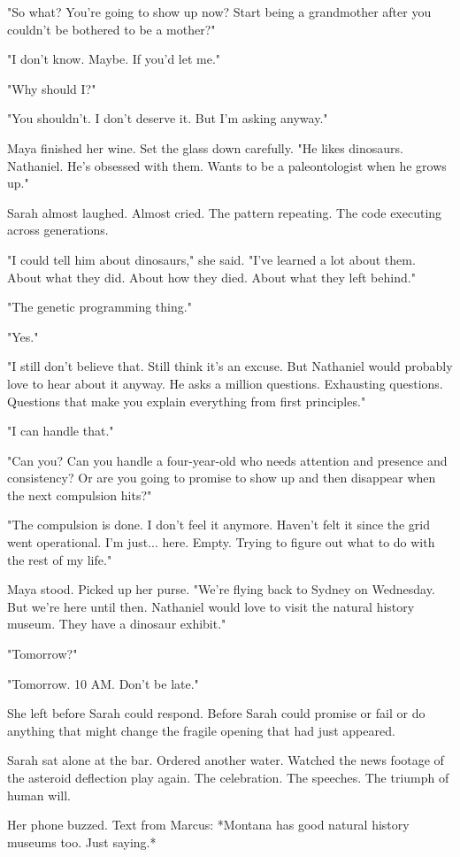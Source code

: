 "So what? You're going to show up now? Start being a grandmother after you couldn't be bothered to be a mother?"

"I don't know. Maybe. If you'd let me."

"Why should I?"

"You shouldn't. I don't deserve it. But I'm asking anyway."

Maya finished her wine. Set the glass down carefully. "He likes dinosaurs. Nathaniel. He's obsessed with them. Wants to be a paleontologist when he grows up."

Sarah almost laughed. Almost cried. The pattern repeating. The code executing across generations.

"I could tell him about dinosaurs," she said. "I've learned a lot about them. About what they did. About how they died. About what they left behind."

"The genetic programming thing."

"Yes."

"I still don't believe that. Still think it's an excuse. But Nathaniel would probably love to hear about it anyway. He asks a million questions. Exhausting questions. Questions that make you explain everything from first principles."

"I can handle that."

"Can you? Can you handle a four-year-old who needs attention and presence and consistency? Or are you going to promise to show up and then disappear when the next compulsion hits?"

"The compulsion is done. I don't feel it anymore. Haven't felt it since the grid went operational. I'm just... here. Empty. Trying to figure out what to do with the rest of my life."

Maya stood. Picked up her purse. "We're flying back to Sydney on Wednesday. But we're here until then. Nathaniel would love to visit the natural history museum. They have a dinosaur exhibit."

"Tomorrow?"

"Tomorrow. 10 AM. Don't be late."

She left before Sarah could respond. Before Sarah could promise or fail or do anything that might change the fragile opening that had just appeared.

Sarah sat alone at the bar. Ordered another water. Watched the news footage of the asteroid deflection play again. The celebration. The speeches. The triumph of human will.

Her phone buzzed. Text from Marcus: *Montana has good natural history museums too. Just saying.*

